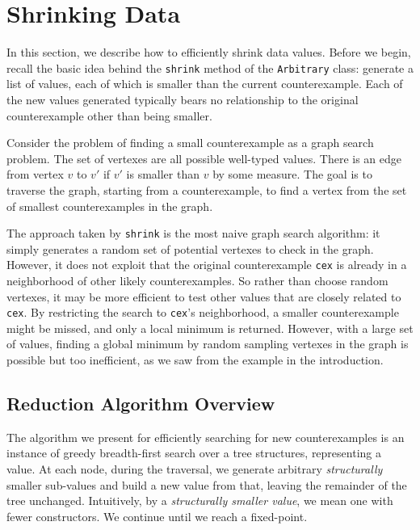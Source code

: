 \documentclass[10pt]{sigplanconf}
\newcommand{\ttp}[1]{\texttt{#1}}
\begin{document}
\section{Shrinking Data}\label{sec:shrinking}
In this section, we describe how to efficiently shrink data values.  Before we
begin, recall the basic idea behind the \ttp{shrink} method of the
\ttp{Arbitrary} class: generate a list of values, each of which is smaller than
the current counterexample.  Each of the new values generated typically bears no
relationship to the original counterexample other than being smaller.

Consider the problem of finding a small counterexample as a graph search
problem.  The set of vertexes are all possible well-typed values.  There is an
edge from vertex $v$ to $v'$ if $v'$ is smaller than $v$ by some measure.  The
goal is to traverse the graph, starting from a counterexample, to find a vertex
from the set of smallest counterexamples in the graph.

The approach taken by \ttp{shrink} is the most naive graph search algorithm: it
simply generates a random set of potential vertexes to check in the graph.
However, it does not exploit that the original counterexample \ttp{cex} is
already in a neighborhood of other likely counterexamples.  So rather than
choose random vertexes, it may be more efficient to test other values that are
closely related to \ttp{cex}.  By restricting the search to \ttp{cex}'s
neighborhood, a smaller counterexample might be missed, and only a local minimum
is returned.  However, with a large set of values, finding a global minimum by
random sampling vertexes in the graph is possible but too inefficient, as we saw
from the example in the introduction.

\subsection{Reduction Algorithm Overview}\label{sec:reduct}
The algorithm we present for efficiently searching for new counterexamples is an
instance of greedy breadth-first search over a tree structures, representing a
value.  At each node, during the traversal, we generate arbitrary
\emph{structurally} smaller sub-values and build a new value from that, leaving
the remainder of the tree unchanged.  Intuitively, by a \emph{structurally
  smaller value}, we mean one with fewer constructors.  We continue until we
reach a fixed-point.
\end{document}
